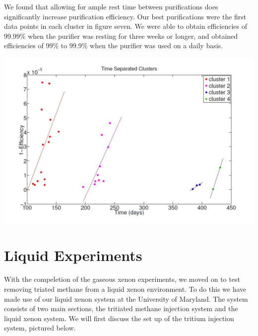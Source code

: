 \documentclass[a4paper,12pt]{article}
\begin{document}
We found that allowing for ample rest time between purifications does significantly increase purification efficiency. Our best purifications were the first data points in each cluster in figure seven.  We were able to obtain efficiencies of 99.99\% when the purifier was resting for three weeks or longer, and obtained efficiencies of 99\% to 99.9\% when the purifier was used on a daily basis.

\begin{center}
\includegraphics[scale=0.5]{Figfour.jpg}
\end{center}

\section{Liquid Experiments}

With the compeletion of the gaseous xenon experiments, we moved on to test removing triated methane from a liquid xenon environment.  To do this we have made use of our liquid xenon system at the University of Maryland.  The system consists of two main sections, the tritiated methane injection system and the liquid xenon system.  We will first discuss the set up of the tritium injection system, pictured below.
\end{document}
